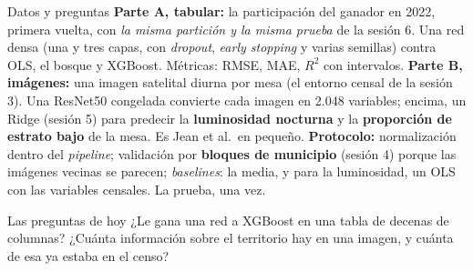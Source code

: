 \documentclass{beamer}
\newcommand{\1}{\mathbb{I}}
\begin{document}
\begin{frame}{Datos y preguntas}
\small
\textbf{Parte A, tabular:} la participación del ganador en 2022, primera vuelta, con \emph{la misma partición y la misma prueba} de la sesión 6. Una red densa (una y tres capas, con \emph{dropout}, \emph{early stopping} y varias semillas) contra OLS, el bosque y XGBoost. Métricas: RMSE, MAE, $R^2$ con intervalos.
\pause
\vspace{0.05cm}
\textbf{Parte B, imágenes:} una imagen satelital diurna por mesa (el entorno censal de la sesión 3). Una ResNet50 congelada convierte cada imagen en 2.048 variables; encima, un Ridge (sesión 5) para predecir la \textbf{luminosidad nocturna} y la \textbf{proporción de estrato bajo} de la mesa. Es Jean et al.\ en pequeño.
\pause
\vspace{0.05cm}
\textbf{Protocolo:} normalización dentro del \emph{pipeline}; validación por \textbf{bloques de municipio} (sesión 4) porque las imágenes vecinas se parecen; \emph{baselines}: la media, y para la luminosidad, un OLS con las variables censales. La prueba, una vez.
\pause
\begin{block}{Las preguntas de hoy}
¿Le gana una red a XGBoost en una tabla de decenas de columnas? ¿Cuánta información sobre el territorio hay en una imagen, y cuánta de esa ya estaba en el censo?
\end{block}
\end{frame}
\end{document}
